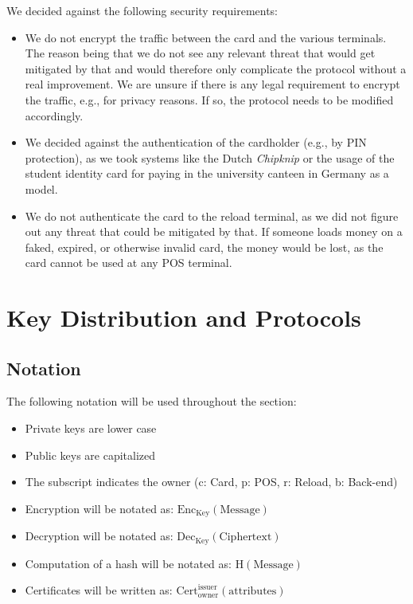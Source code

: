We decided against the following security requirements:
\begin{itemize}
    \item We do not encrypt the traffic between the card and the various terminals.
    The reason being that we do not see any relevant threat that would get mitigated by that and would therefore only complicate the protocol without a real improvement.
    We are unsure if there is any legal requirement to encrypt the traffic, e.g., for privacy reasons.
    If so, the protocol needs to be modified accordingly.
    
    \item We decided against the authentication of the cardholder (e.g., by PIN protection), as we took systems like the Dutch \emph{Chipknip} or the usage of the student identity card for paying in the university canteen in Germany as a model.

    \item We do not authenticate the card to the reload terminal, as we did not figure out any threat that could be mitigated by that.
    If someone loads money on a faked, expired, or otherwise invalid card, the money would be lost, as the card cannot be used at any POS terminal.
\end{itemize}


\section{Key Distribution and Protocols}
\subsection{Notation}
The following notation will be used throughout the section:
\begin{itemize}
    \item Private keys are lower case
    
    \item Public keys are capitalized
    
    \item The subscript indicates the owner (c: Card, p: POS, r: Reload, b: Back-end)
    
    \item Encryption will be notated as: $\textrm{Enc}_{\textrm{Key}}(\textrm{Message})$

    \item Decryption will be notated as: $\textrm{Dec}_{\textrm{Key}}(\textrm{Ciphertext})$
    
    \item Computation of a hash will be notated as: $\textrm{H}(\textrm{Message})$
    
    \item Certificates will be written as: $\textrm{Cert}_\textrm{owner}^\textrm{issuer}(\textrm{attributes})$
\end{itemize}


